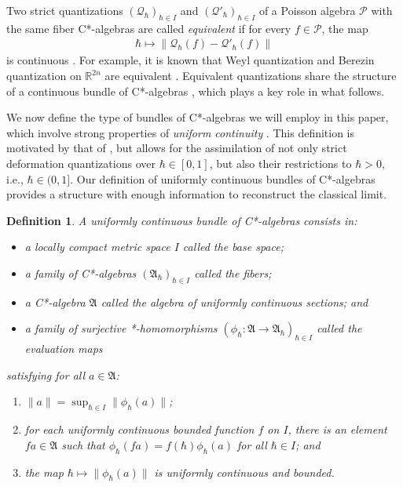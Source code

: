 \documentclass[sn-mathphys,Numbered]{sn-jnl}
\newtheorem{definition}{Definition}%
\providecommand{\norm}[1]{\lVert#1\rVert}
\begin{document}
Two strict quantizations $(\mathcal{Q}_\hbar)_{\hbar\in I}$ and $(\mathcal{Q}'_\hbar)_{\hbar\in I}$ of a Poisson algebra $\mathcal{P}$ with the same fiber C*-algebras are called \emph{equivalent} if for every $f\in\mathcal{P}$, the map
\begin{align}
    \hbar\mapsto \norm{\mathcal{Q}_\hbar(f)-\mathcal{Q}'_\hbar(f)}
\end{align}
is continuous \citep{La98b}.  For example, it is known that Weyl quantization and Berezin quantization on $\mathbb{R}^{2n}$ are equivalent \citep{La98b}.  Equivalent quantizations share the structure of a continuous bundle of C*-algebras \citep{Di77,FeDo88,KiWa95,Ni96}, which plays a key role in what follows.

We now define the type of bundles of C*-algebras we will employ in this paper, which involve strong properties of \emph{uniform continuity} \citep{StFe21,FeSt24}.  This definition is motivated by that of \citet{KiWa95}, but allows for the assimilation of not only strict deformation quantizations over $\hbar \in [0,1]$, but also their restrictions to $\hbar>0$, i.e., $\hbar\in (0,1]$.
  Our definition of uniformly continuous bundles of C*-algebras provides a structure with enough information to reconstruct the classical limit.\bigskip

\begin{definition} \label{def:bun}
    A \emph{uniformly continuous bundle of C*-algebras} consists in:
    \begin{itemize}
        \item a locally compact metric space $I$ called the \emph{base space};
        \item a family of C*-algebras $(\mathfrak{A}_\hbar)_{\hbar\in I}$ called the \emph{fibers};
        \item a C*-algebra $\mathfrak{A}$ called the algebra of \emph{uniformly continuous sections}; and
        \item a family of surjective *-homomorphisms $(\phi_\hbar: \mathfrak{A}\to\mathfrak{A}_\hbar)_{\hbar\in I}$ called the \emph{evaluation maps}
    \end{itemize}
    satisfying for all $a\in\mathfrak{A}$:
    \begin{enumerate}
        \item $\norm{a} = \sup_{\hbar\in I} \norm{\phi_\hbar(a)}$;
        \item for each uniformly continuous bounded function $f$ on $I$, there is an element $fa\in \mathfrak{A}$ such that $\phi_\hbar(fa) = f(\hbar)\phi_\hbar(a)$ for all $\hbar\in I$; and
        \item the map $\hbar\mapsto \norm{\phi_\hbar(a)}$ is uniformly continuous and bounded.
    \end{enumerate}
\end{definition}\bigskip
\end{document}
